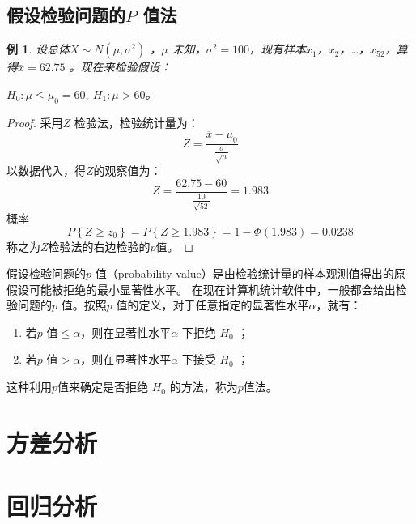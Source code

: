 \documentclass[11pt]{book}
\newtheorem{exercise}{\hspace{2em}\textbf{例}}[section]
\newcounter{#2}
\newcounter{#2}[#1]
\numberwithin{#2}{#1}
\begin{document}
	
	\section{假设检验问题的$ P $ 值法}
	\begin{exercise}
	设总体$ X \sim N(\mu ,\sigma ^{2})$ ，$ \mu $ 未知，$ \sigma ^{2}=100 $，现有样本$ x_1 $，$ x_2 $，\dots ，$ x_{52} $，算得$ \overline{x} = 62.75$ 。现在来检验假设：
	\begin{center}
		$ H_0:\mu \le \mu _0=60,\ H_1 :\mu >60 $。
	\end{center}
\end{exercise}

\begin{proof}
	采用$ Z $ 检验法，检验统计量为：
	\begin{equation*}
		Z=\frac{\overline{x} - \mu_0}{\frac{\sigma}{\sqrt{n}}}
	\end{equation*}
	以数据代入，得$Z$的观察值为：
	\begin{equation*}
		Z=\frac{62.75 - 60}{\frac{10}{\sqrt{52}}}=1.983
	\end{equation*}
	概率
	\begin{equation*}
		P\left\lbrace Z \ge z_0\right\rbrace =P\left\lbrace Z\ge1.983\right\rbrace =1-\Phi(1.983)=0.0238
	\end{equation*}
	称之为$Z$检验法的右边检验的$p$值。
\end{proof}
\begin{newdef}
	假设检验问题的$ p $ 值（probability value）是由检验统计量的样本观测值得出的原假设可能被拒绝的最小显著性水平。
	在现在计算机统计软件中，一般都会给出检验问题的$ p $ 值。按照$ p $ 值的定义，对于任意指定的显著性水平$ \alpha $，就有：
	
	\begin{enumerate}
		\item 若$ p $ 值$ \le \alpha $，则在显著性水平$ \alpha $ 下拒绝 $ H_0 $ ；
		\item 若$ p $ 值$ > \alpha $，则在显著性水平$ \alpha $ 下接受 $ H_0 $ ；
	\end{enumerate}
这种利用$p$值来确定是否拒绝 $ H_0 $ 的方法，称为$p$值法。
\end{newdef}


	\chapter{方差分析}
	\chapter{回归分析}
	
	
\end{document}
